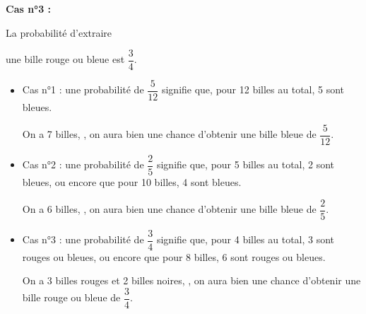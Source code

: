 \begin{Maquette}[Fiche,CorrigeFin,Colonnes=2]{}
\begin{multicols}{2}
\begin{exercice}[Dur]
\begin{minipage}{2.5cm}
         \end{minipage}
         \begin{minipage}{5.3cm}
            {\bf Cas n°3 :} \par
            La probabilité d'extraire \par
            une bille rouge ou bleue est $\dfrac{3}{4}$.
         \end{minipage}
      \end{exercice}
      
      \begin{Solution}
         \begin{itemize}
            \item Cas n°1 : une probabilité de $\dfrac{5}{12}$ signifie que, pour 12 billes au total, 5 sont bleues. \par
               On a 7 billes, , on aura bien une chance d'obtenir une bille bleue de $\dfrac{5}{12}$.
            \item Cas n°2 : une probabilité de $\dfrac{2}{5}$ signifie que, pour 5 billes au total, 2 sont bleues, ou encore que pour 10 billes, 4 sont bleues. \par
               On a 6 billes, , on aura bien une chance d'obtenir une bille bleue de $\dfrac{2}{5}$.
            \item Cas n°3 : une probabilité de $\dfrac{3}{4}$ signifie que, pour 4 billes au total, 3 sont rouges ou bleues, ou encore que pour 8 billes, 6 sont rouges ou bleues. \par
               On a 3 billes rouges et 2 billes noires, , on aura bien une chance d'obtenir une bille rouge ou bleue de $\dfrac{3}{4}$.
         \end{itemize}
      \end{Solution}

   \end{multicols}

\end{Maquette}


